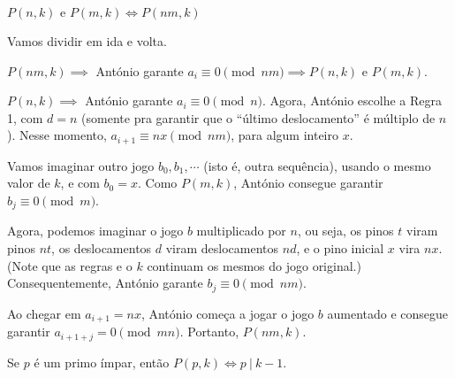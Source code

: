 \documentclass[10pt, a4paper]{article}
\begin{document}
	\begin{lem}
		$P(n, k)\text{ e } P(m, k) \iff P(nm, k)$
	\end{lem}

	\begin{dem}
		Vamos dividir em ida e volta.

		$P(nm, k) \implies $ António garante $a_i \equiv 0 \pmod{nm} \implies P(n, k)\text{ e }P(m, k)$.
		
		$P(n, k) \implies $ António garante $a_i \equiv 0 \pmod{n}$. Agora, António escolhe a Regra 1, com $d = n$ (somente pra garantir que o ``último deslocamento'' é múltiplo de $n$). Nesse momento, $a_{i+1} \equiv nx \pmod{nm}$, para algum inteiro $x$.

		Vamos imaginar outro jogo $b_0, b_1, \cdots$ (isto é, outra sequência), usando o mesmo valor de $k$, e com $b_0 = x$. Como $P(m, k)$, António consegue garantir $b_j \equiv 0 \pmod{m}$.

		Agora, podemos imaginar o jogo $b$ multiplicado por $n$, ou seja, os pinos $t$ viram pinos $nt$, os deslocamentos $d$ viram deslocamentos $nd$, e o pino inicial $x$ vira $nx$. (Note que as regras e o $k$ continuam os mesmos do jogo original.) Consequentemente, António garante $b_j \equiv 0 \pmod{nm}$.

		Ao chegar em $a_{i+1} = nx$, António começa a jogar o jogo $b$ aumentado e consegue garantir $a_{i+1+j} = 0  \pmod{mn}$. Portanto, $P(nm, k)$.
	\end{dem}

	\begin{lem}
		Se $p$ é um primo ímpar, então $P(p, k) \iff p\ |\ k-1$.
	\end{lem}
\end{document}
